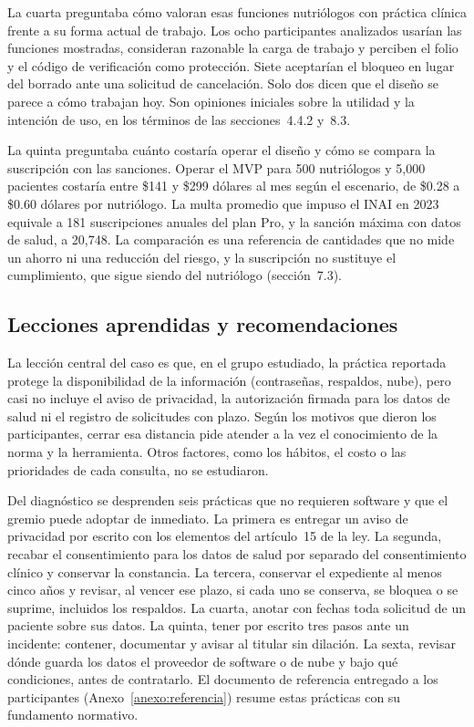 \documentclass[12pt, a4paper]{article}
\begin{document}
La cuarta preguntaba cómo valoran esas funciones nutriólogos con
práctica clínica frente a su forma actual de trabajo. Los ocho
participantes analizados usarían las funciones mostradas, consideran
razonable la carga de trabajo y perciben el folio y el código de verificación
como protección. Siete aceptarían el bloqueo en lugar del borrado ante
una solicitud de cancelación. Solo dos dicen que el diseño se parece a
cómo trabajan hoy. Son opiniones iniciales sobre la utilidad y la
intención de uso, en los
términos de las secciones~4.4.2 y~8.3.

La quinta preguntaba cuánto costaría operar el diseño y cómo se compara
la suscripción con las sanciones. Operar el MVP para
500 nutriólogos y 5,000 pacientes costaría entre \$141 y \$299 dólares
al mes según el escenario, de \$0.28 a \$0.60 dólares por nutriólogo. La
multa promedio que impuso el INAI en 2023 equivale a 181 suscripciones
anuales del plan Pro, y la sanción máxima con datos de salud, a 20,748.
La comparación es una referencia de cantidades que no mide un ahorro ni una reducción del riesgo, y la suscripción no sustituye el cumplimiento, que sigue
siendo del nutriólogo (sección~7.3).

\subsection{Lecciones aprendidas y recomendaciones}
La lección central del caso es que, en el grupo estudiado, la práctica reportada protege la disponibilidad de la información (contraseñas, respaldos,
nube), pero casi no incluye el aviso
de privacidad, la autorización firmada para los datos de salud ni el registro de solicitudes con plazo. Según los motivos que dieron los participantes, cerrar esa distancia pide atender a la vez el conocimiento de la norma y la herramienta. Otros factores, como los hábitos, el costo o las prioridades de cada consulta, no se estudiaron.

Del diagnóstico se desprenden seis prácticas que no requieren software y
que el gremio puede adoptar de inmediato. La primera es entregar un
aviso de privacidad por escrito con los elementos del artículo~15 de la
ley. La segunda, recabar el consentimiento para los datos de salud por
separado del consentimiento clínico y conservar la constancia. La
tercera, conservar el expediente al menos cinco años y revisar, al vencer ese plazo, si cada uno se conserva, se bloquea o se suprime, incluidos los respaldos. La cuarta, anotar con
fechas toda solicitud de un paciente sobre sus datos. La quinta, tener
por escrito tres pasos ante un incidente: contener, documentar y avisar
al titular sin dilación. La sexta, revisar dónde guarda los datos el
proveedor de software o de nube y bajo qué condiciones, antes de
contratarlo. El documento de referencia entregado a los participantes
(Anexo~\ref{anexo:referencia}) resume estas prácticas con su fundamento
normativo.
\end{document}
